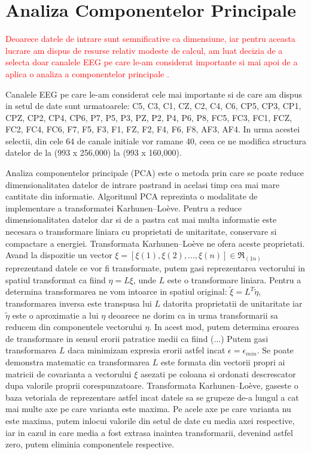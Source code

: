 \section{Analiza Componentelor Principale}

\quad \textcolor{red}{	
Deoarece datele de intrare sunt semnificative ca dimensiune, iar pentru aceasta
lucrare am dispus de resurse relativ modeste de calcul, am luat decizia de a 
selecta doar canalele EEG pe care le-am considerat importante si mai apoi
de a aplica o analiza a componentelor principale . }

Canalele EEG pe care le-am considerat cele mai importante si de care am dispus in 
setul de date sunt urmatoarele: C5, C3, C1, CZ, C2, C4, C6, CP5, CP3, CP1, CPZ,
CP2, CP4, CP6, P7, P5, P3, PZ, P2, P4, P6, P8, FC5, FC3, FC1, FCZ, FC2, FC4, FC6,
F7, F5, F3, F1, FZ, F2, F4, F6, F8, AF3, AF4.
In urma acestei selectii, din cele 64 de canale initiale vor ramane 40, ceea ce 
ne modifica structura datelor de la (993 x 256,000) la (993 x 160,000).

Analiza componentelor principale (PCA) este o metoda prin care se poate reduce
dimensionalitatea datelor de intrare pastrand in acelasi timp cea mai mare
cantitate din informatie. Algoritmul PCA reprezinta o modalitate
de implementare a transformatei Karhunen–Loève. Pentru a reduce dimensionalitatea
datelor dar si de a pastra cat mai multa informatie este necesara o transformare
liniara cu proprietati de unitaritate, conservare si compactare a energiei.
Transformata Karhunen–Loève ne ofera aceste proprietati. Avand la dispozitie
un vector $ \xi = [\xi(1), \xi(2), ..., \xi(n)  ] \in \Re_{(1  n)} $
reprezentand datele ce vor fi transformate, putem gasi reprezentarea vectorului in
spatiul transformat ca fiind $ \eta=L\xi $, unde $ L $ este o transformare liniara.
Pentru a determina transformarea ne vom intoarce in spatiul original: $ \tilde{\xi} = L^T \tilde{\eta} $, transformarea inversa este transpusa lui $ L $ datorita proprietatii
de unitaritate iar $ \tilde{\eta} $ este o aproximatie a lui $ \eta $ deoarece ne 
dorim ca in urma transformarii sa reducem din componentele vectorului $ \eta $.
In acest mod, putem determina eroarea de transformare in sensul erorii patratice medii
ca fiind (...)
Putem gasi transformarea $ L $ daca minimizam expresia erorii astfel incat
$ \epsilon = \epsilon_{min} $. Se poate demonstra matematic ca transformarea $ L $
este formata din vectorii propri ai matricii de covarianta a vectorului $ \xi $
asezati pe coloana si ordonati descrescator dupa valorile proprii corespunzatoare.
Transformata Karhunen–Loève, gaseste o baza vetoriala de reprezentare astfel incat 
datele sa se grupeze de-a lungul a cat mai multe axe pe care varianta este maxima.
Pe acele axe pe care varianta nu este maxima, putem inlocui valorile din setul de 
date cu media axei respective, iar in cazul in care media a fost extrasa inaintea
transformarii, devenind astfel zero, putem eliminia componentele respective.

